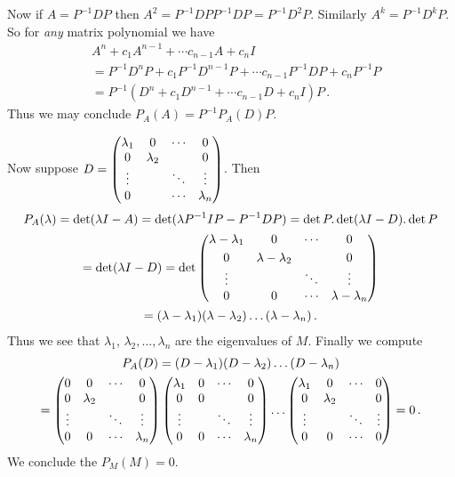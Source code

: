 \begin{enumerate}
Now if $A=P^{-1}DP$ then $A^2=P^{-1}DPP^{-1}DP=P^{-1}D^2P$. Similarly $A^k=P^{-1} D^k P$. So for {\itshape any} matrix polynomial we have
\begin{align*}
& A^n + c_1 A^{n-1} + \cdots c_{n-1} A + c_n I \\
&= P^{-1}D^nP + c_1 P^{-1}D^{n-1}P + \cdots c_{n-1} P^{-1}DP + c_n P^{-1}P \\
&= P^{-1}( D^n + c_1 D^{n-1} + \cdots c_{n-1} D + c_n I)P\, .
\end{align*}
Thus we may conclude $P_A(A)=P^{-1} P_A(D) P$. 

Now suppose 
$D=\begin{pmatrix}\lambda_1 & \mc0 &\cdots & \mc0 \\ \mc0 &\lambda_2 & &\mc 0\\ \mc\vdots& & \ddots &\mc\vdots \\ \mc0 &&\cdots    &\lambda_n \end{pmatrix}$. Then 
\begin{gather*}P_A(\lambda) = \det(\lambda I - A) = \det(\lambda P^{-1} I P - P^{-1} D P) = \det P . \det(\lambda I - D). \det P\\
= \det(\lambda I - D)=\det\begin{pmatrix}\lambda-\lambda_1 & \mc0 &\cdots & \mc0 \\[1mm] \mc0 &\lambda-\lambda_2 & &\mc 0 \\ \mc\vdots& & \ddots &\mc\vdots \\ \mc0 &\mc 0&\cdots    &\lambda-\lambda_n \end{pmatrix}\\=(\lambda-\lambda_1)(\lambda-\lambda_2)\ldots (\lambda-\lambda_n)\, .
\end{gather*}
Thus we see that $\lambda_1$, $\lambda_2, \ldots , \lambda_n$ are the eigenvalues of $M$. Finally we compute 
\begin{gather*}
P_A(D) = (D-\lambda_1)(D-\lambda_2)\ldots (D-\lambda_n)
\\
=\begin{pmatrix}\mc 0 & \mc 0 &\cdots & \mc 0 \\ \mc 0 &\lambda_2 & &\mc 0 \\ \mc\vdots& & \ddots &\mc\vdots \\ \mc 0 &\mc 0&\cdots    &\lambda_n \end{pmatrix}
\begin{pmatrix}\lambda_1 & \mc 0 &\cdots & \mc 0 \\ \mc 0 &\mc 0 & &\mc 0 \\ \mc\vdots& & \ddots &\mc\vdots \\ \mc 0 &\mc 0&\cdots    &\lambda_n \end{pmatrix}
\ldots
\begin{pmatrix}\lambda_1 & \mc 0 &\cdots & \mc 0 \\ \mc 0 &\lambda_2 & &\mc 0 \\ \mc\vdots& & \ddots & \mc\vdots\\ \mc 0 &\mc 0&\cdots    &\mc 0\end{pmatrix}
=0\, .
\end{gather*}
We conclude the $P_M(M)=0$.



\end{enumerate}

